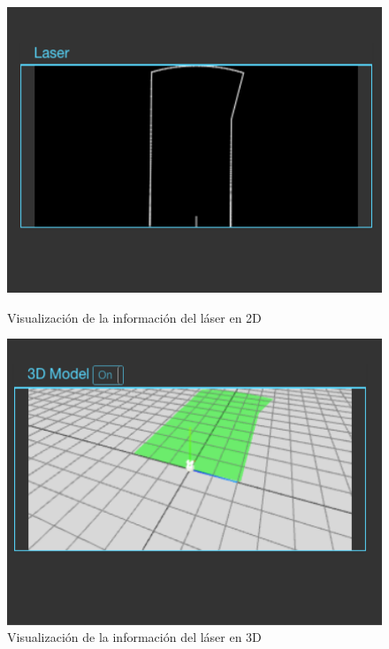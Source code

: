 \begin{figure}[htb]
\centering
  \begin{minipage}{0.45\textwidth}
    \centering
    \includegraphics[width=1\textwidth]{figures/laser2dturtle.png}
    \caption{Visualización de la información del láser en 2D}
    \label{fig.laser2dturtle}
  \end{minipage}%
  \hspace{5mm}
  \begin{minipage}{0.45\textwidth}
    \centering
    \includegraphics[width=1\textwidth]{figures/laser3dturtle.png}
    \caption{Visualización de la información del láser en 3D}
    \label{fig.laser3dturtle}
  \end{minipage}
\end{figure}

